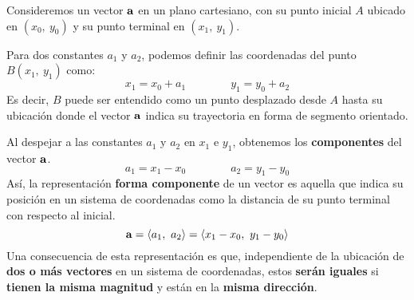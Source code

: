 \documentclass[12pt]{article}
\begin{document}
Consideremos un vector $\mathbf{a}$ en un plano cartesiano, con su punto inicial $A$ ubicado en $(x_{0}, \ y_{0})$ y su punto terminal en $(x_{1}, \ y_{1})$.

\begin{figure}[hbt!]
\centering


\end{figure}

Para dos constantes $a_{1}$ y $a_{2}$, podemos definir las coordenadas del punto $B(x_{1}, \ y_{1})$ como:
\[
  x_{1} = x_{0} + a_{1} \qquad \qquad y_{1} = y_{0} + a_{2}
\]
Es decir, $B$ puede ser entendido como un punto desplazado desde $A$ hasta su ubicación donde el vector $\mathbf{a}$ indica su trayectoria en forma de segmento orientado.

Al despejar a las constantes $a_{1}$ y $a_{2}$ en $x_{1}$ e $y_{1}$, obtenemos los \textbf{componentes} del vector $\mathbf{a}$.
\[
  a_{1} = x_{1} - x_{0} \qquad \qquad a_{2} = y_{1} - y_{0}
\]
Así, la representación \textbf{forma componente} de un vector es aquella que indica su posición en un sistema de coordenadas como la distancia de su punto terminal con respecto al inicial.
\[
  \mathbf{a} = \langle a_{1}, \ a_{2} \rangle = \langle x_{1} - x_{0}, \ y_{1} - y_{0} \rangle
\]
Una consecuencia de esta representación es que, independiente de la ubicación de \textbf{dos o más vectores} en un sistema de coordenadas, estos \textbf{serán iguales} si \textbf{tienen la misma magnitud} y están en la \textbf{misma dirección}.
\end{document}
